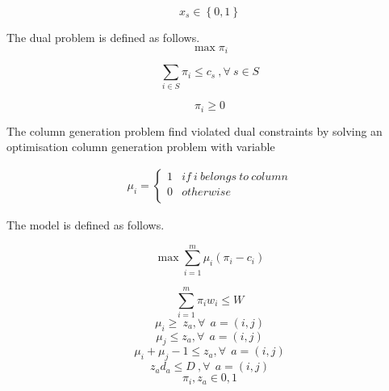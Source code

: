 \begin{equation}
    x_s\in\left\{0,1\right\} 
\end{equation}

The dual problem is defined as follows.
\begin{equation}
    \max{\pi_i}
\end{equation}

\begin{equation}
    \sum_{i\in S}{\pi_i\le c_s\ , \forall\ s\in S }
\end{equation}

\begin{equation}
    \pi_i\geq0
\end{equation}

The column generation problem find violated dual constraints by solving an optimisation column generation problem with variable

\begin{equation}
   \begin{split}
   \mu_{i}=\left\{
                \begin{array}{ll}
                  1 & if\ i\ belongs\ to\ column\\
                  0 & otherwise\\
                \end{array}
              \right.
   \end{split}
\end{equation}

The model is defined as follows.

\begin{equation}
    \max{\sum_{i=1}^{m}{\mu_i(\pi_i-c_i)}}
\end{equation}

\begin{equation}
    \sum_{i=1}^{m}{\pi_iw_i\le W}
\end{equation}
\begin{equation}
    \mu_i\geq\ z_a , \forall\ \ a=(i,j)
\end{equation}
\begin{equation}
    \mu_j\le z_a , \forall\ \ a=\left(i,j\right)
\end{equation}
\begin{equation}
    \mu_i+\mu_j-1\le z_a , \forall\ \ a=(i,j)
\end{equation}
\begin{equation}
    z_ad_a\le D\ , \forall\ \ a=(i,j)
\end{equation}
\begin{equation}
    \pi_i,z_a\in{0,1}
\end{equation}

